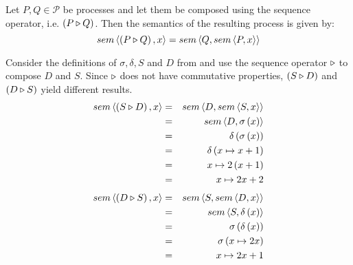 \begin{definition}
\label{def:sem_sequence}
Let $P, Q \in \mathcal{P}$ be processes and let them be composed using the sequence operator, i.e. $\left( P \triangleright Q \right)$. Then the semantics of the resulting process is given by:
  \begin{equation}
    \label{eqn:sem_sequence}
    sem \left\langle \left( P \triangleright Q \right), x \right\rangle = sem \left\langle Q, sem \left\langle P, x \right\rangle \right\rangle
  \end{equation}
  \hfill\qedsymbol
\end{definition}

\begin{example}
\label{exp:sem_sequence}
Consider the definitions of $\sigma, \delta, S$ and $D$ from  and use the sequence operator $\triangleright$ to compose $D$ and $S$. Since $\triangleright$ does not have commutative properties, $\left( S \triangleright D \right)$ and $\left( D \triangleright S \right)$ yield different results.
  \begin{eqnarray*}
    sem \left\langle \left( S \triangleright D \right), x \right\rangle & = & sem \left\langle D, sem \left\langle S, x \right\rangle \right\rangle \\
                             & = & sem \left\langle D, \sigma \left( x \right) \right\rangle \\
                             & = & \delta \left( \sigma \left( x \right) \right) \\
                             & = & \delta \left( x \mapsto x+1 \right) \\
                             & = & x \mapsto 2 \left( x+1 \right) \\
                             & = & x \mapsto 2x+2
  \end{eqnarray*}
  \begin{eqnarray*}
    sem \left\langle \left( D \triangleright S \right), x \right\rangle & = & sem \left\langle S, sem \left\langle D, x \right\rangle \right\rangle \\
                             & = & sem \left\langle S, \delta \left( x \right) \right\rangle \\
                             & = & \sigma \left( \delta \left( x \right) \right) \\
                             & = & \sigma \left( x \mapsto 2x \right) \\
                             & = & x \mapsto 2x + 1
  \end{eqnarray*}
  \hfill\qedsymbol
\end{example}



